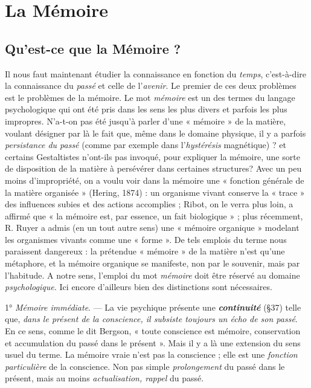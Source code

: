 \chapter{La Mémoire}

\section{Qu'est-ce que la Mémoire ?}%
Il nous faut maintenant
étudier la connaissance en fonction du {\it temps}, c’est-à-dire la connaissance
du {\it passé} et celle de l’{\it avenir}. Le premier de ces deux problèmes
est le problèmes de la mémoire. Le mot {\it mémoire} est un des termes
du langage psychologique qui ont été pris dans les sens les plus divers
et parfois les plus impropres. N’a-t-on pas été jusqu’à parler d’une
« mémoire » de la matière, voulant désigner par là le fait que, même
dans le domaine physique, il y a parfois {\it persistance du passé} (comme
par exemple dans l’{\it hystérésis} magnétique) ? et certains Gestaltistes
n’ont-ils pas invoqué, pour expliquer la mémoire, une sorte de disposition
de la matière à persévérer dans certaines structures? Avec un peu
moins d’impropriété, on a voulu voir dans la mémoire une « fonction
générale de la matière organisée » (Hering, 1874) : un organisme
vivant conserve la « trace » des influences subies et des actions accomplies ;
Ribot, on le verra plus loin, a affirmé que « la mémoire est, par
essence, un fait biologique » ; plus récemment, R. Ruyer a admis (en
un tout autre sens) une « mémoire organique » modelant les organismes
vivants comme une « forme ». De tels emplois du terme nous paraissent
dangereux : la prétendue « mémoire » de la matière n’est qu’une métaphore,
et la mémoire organique se manifeste, non par le souvenir,
mais par l’habitude. A notre sens, l'emploi du mot {\it mémoire} doit être
réservé au domaine {\it psychologique.} Ici encore d’ailleurs bien des
distinctions sont nécessaires.

1° {\it Mémoire immédiate}. — La vie psychique présente une \textbf{\textit {continuité}}
(\S 37) telle que, {\it dans le présent de la conscience, il subsiste toujours
un écho de son passé}. En ce sens, comme le dit Bergson, « toute
conscience est mémoire, conservation et accumulation du passé
dans le présent ». Mais il y a là une extension du sens usuel du terme.
La mémoire vraie n’est pas la conscience ; elle est une {\it fonction particulière}
de la conscience. Non pas simple {\it prolongement} du passé dans
le présent, mais au moins {\it actualisation, rappel} du passé.

